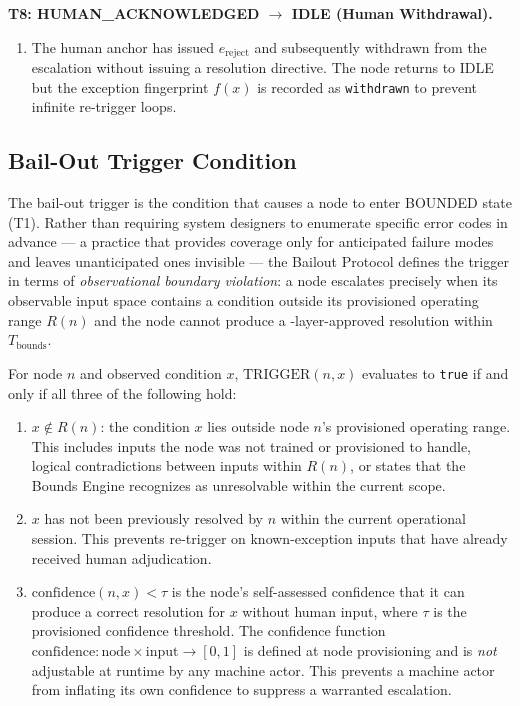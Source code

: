 \bigskip
\noindent\textbf{T8: HUMAN\_ACKNOWLEDGED $\rightarrow$ IDLE (Human Withdrawal).}

\begin{enumerate}
    \item[(T8-C1)] The human anchor has issued $e_{\text{reject}}$ and subsequently withdrawn from the escalation without issuing a resolution directive. The node returns to IDLE but the exception fingerprint $f(x)$ is recorded as \texttt{withdrawn} to prevent infinite re-trigger loops.
\end{enumerate}

\subsection{Bail-Out Trigger Condition}
\label{sec:bp-trigger}

The bail-out trigger is the condition that causes a node to enter BOUNDED state (T1). Rather than requiring system designers to enumerate specific error codes in advance --- a practice that provides coverage only for anticipated failure modes and leaves unanticipated ones invisible --- the Bailout Protocol defines the trigger in terms of \emph{observational boundary violation}: a node escalates precisely when its observable input space contains a condition outside its provisioned operating range $R(n)$ and the node cannot produce a \fact-layer-approved resolution within $T_{\text{bounds}}$.

\begin{definition}
\label{def:trigger}
For node $n$ and observed condition $x$, $\text{TRIGGER}(n, x)$ evaluates to \texttt{true} if and only if all three of the following hold:

\begin{enumerate}
    \item[(i)] $x \notin R(n)$: the condition $x$ lies outside node $n$'s provisioned operating range. This includes inputs the node was not trained or provisioned to handle, logical contradictions between inputs within $R(n)$, or states that the Bounds Engine recognizes as unresolvable within the current scope.

    \item[(ii)] $x$ has not been previously resolved by $n$ within the current operational session. This prevents re-trigger on known-exception inputs that have already received human adjudication.

    \item[(iii)] $\text{confidence}(n, x) < \tau$ is the node's self-assessed confidence that it can produce a correct resolution for $x$ without human input, where $\tau$ is the provisioned confidence threshold. The confidence function $\text{confidence} : \text{node} \times \text{input} \rightarrow [0, 1]$ is defined at node provisioning and is \emph{not} adjustable at runtime by any machine actor. This prevents a machine actor from inflating its own confidence to suppress a warranted escalation.
\end{enumerate}
\end{definition}

